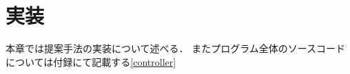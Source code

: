 \chapter{実装}
\label{implementation}

本章では提案手法の実装について述べる．
またプログラム全体のソースコードについては付録にて記載する\ref{controller}








